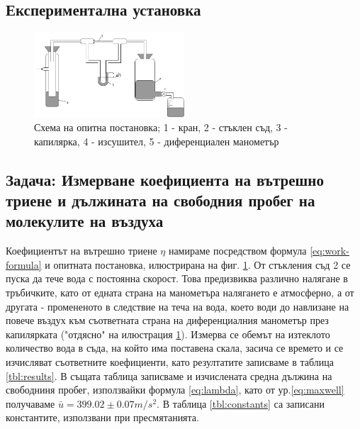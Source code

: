 \documentclass[12pt]{article}
\begin{document}
\subsection{Експериментална установка}
\begin{figure}
    \centering
    \includegraphics[width=0.5\textwidth]{images/set-up-mean-free-path.drawio.png}
    \caption{\label{fig:setup}Схема на опитна постановка; 1 - кран, 2 - стъклен съд, 3 - капилярка, 4 - изсушител, 5 - диференциален манометър}
    \label{fig:setup}
\end{figure}

\subsection{Задача: Измерване коефициента на вътрешно триене и дължината на свободния пробег на молекулите на въздуха}
Коефициентът на вътрешно триене $\eta$ намираме посредством формула \ref{eq:work-formula} и опитната постановка, илюстрирана на фиг. \ref{fig:setup}. От стъкления съд 2 се пуска да тече вода с постоянна скорост. Това предизвиква различно налягане в тръбичките, като от едната страна на манометъра налягането е атмосферно, а от другата - промененото в следствие на теча на вода, което води до навлизане на повече въздух към съответната страна на диференциалния манометър през капилярката ("отдясно" на илюстрация \ref{fig:setup}). Измерва се обемът на изтеклото количество вода в съда, на който има поставена скала, засича се времето и се изчисляват съответните коефициенти, като резултатите записваме в таблица \ref{tbl:results}. В същата таблица записваме и изчислената средна дължина на свободниня пробег, използвайки формула \ref{eq:lambda}, като от ур.\ref{eq:maxwell} получаваме $\bar{u} = 399.02 \pm 0.07 m/s^2$. В таблица \ref{tbl:constants} са записани константите, използвани при пресмятанията. 
\end{document}
